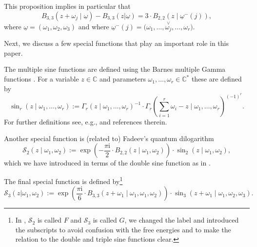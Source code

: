 \documentclass[pdftex]{sigma}
\numberwithin{equation}{section}
\begin{document}
This proposition implies in particular that
\begin{equation}\label{eq:Bernoullipolrec}
 B_{3,3}(z+\omega_j\mid\underline{\omega})-B_{3,3}(z|\underline{\omega})= 3\cdot B_{2,2}(z\mid\underline{\omega}^{-}(j)),
\end{equation}
where $\underline{\omega}=(\omega_1,\omega_2,\omega_3)$ and where $ \underline{\omega}^{-}(j)= \big(\omega_1, \dots,\overset{\vee}{\omega_j},\dots,\omega_r\big)$.

Next, we discuss a few special functions that play an important role in this paper.

The multiple sine functions are defined using the Barnes multiple Gamma functions \cite{Barnes}. For a variable $z\in \mathbb{C}$ and parameters $\omega_1,\ldots,\omega_r \in \mathbb{C}^{*}$ these are defined by
\begin{equation*}
 \sin_r(z \mid \omega_1,\dots,\omega_r):= \Gamma_{r}(z \mid \omega_1,\dots,\omega_r)^{-1} \cdot \Gamma_{r}\left(\sum_{i=1}^r \omega_i - z \mid \omega_1,\dots,\omega_r\right)^{(-1)^r}.
\end{equation*}
For further definitions see, e.g., \cite{BridgelandCon,Ruijsenaars1} and references therein.

Another special function is (related to) Fadeev's quantum dilogarithm
\begin{equation*}%
 \mathcal{S}_2(z \mid \omega_1,\omega_2) := \exp\left(-\frac{\pi \mathrm{i}}{2} \cdot B_{2,2}(z\mid \omega_1,\omega_2)\right) \cdot \sin_2(z \mid \omega_1,\omega_2),
\end{equation*}
which we have introduced in terms of the double sine function as in \cite{BridgelandCon}.

The final special function is defined by\footnote{In \cite{BridgelandCon}, $\mathcal{S}_2$ is called $F$ and $\mathcal{S}_3$ is called $G$, we changed the label and introduced the subscripts to avoid confusion with the free energies and to make the relation to the double and triple sine functions clear.}
\begin{equation*}%
 \mathcal{S}_3(z | \omega_1,\omega_2) := \exp\left(\frac{\pi \mathrm{i}}{6} \cdot B_{3,3}(z+\omega_1 \mid \omega_1,\omega_1,\omega_2)\right) \cdot \sin_3(z+\omega_1 \mid \omega_1,\omega_2,\omega_3).
\end{equation*}
\end{document}
